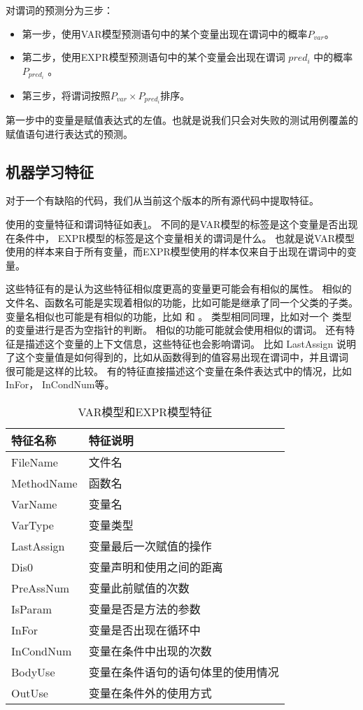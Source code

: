 对谓词的预测分为三步：
\begin{itemize}
\item 第一步，使用VAR模型预测语句中的某个变量出现在谓词中的概率$P_{var}$。
\item 第二步，使用EXPR模型预测语句中的某个变量会出现在谓词 $pred_i$ 中的概率 $P_{pred_i}$ 。
\item 第三步，将谓词按照$P_{var} \times P_{pred_i}$排序。
\end{itemize}

第一步中的变量是赋值表达式的左值。也就是说我们只会对失败的测试用例覆盖的赋值语句进行表达式的预测。

\subsection{机器学习特征}

对于一个有缺陷的代码，我们从当前这个版本的所有源代码中提取特征。

使用的变量特征和谓词特征如表\ref{var_feature}。
不同的是VAR模型的标签是这个变量是否出现在条件中，
EXPR模型的标签是这个变量相关的谓词是什么。
也就是说VAR模型使用的样本来自于所有变量，而EXPR模型使用的样本仅来自于出现在谓词中的变量。

这些特征有的是认为这些特征相似度更高的变量更可能会有相似的属性。
相似的文件名、函数名可能是实现着相似的功能，比如可能是继承了同一个父类的子类。
变量名相似也可能是有相似的功能，比如  和 。
类型相同同理，比如对一个  类型的变量进行是否为空指针的判断。
相似的功能可能就会使用相似的谓词。
还有特征是描述这个变量的上下文信息，这些特征也会影响谓词。
比如 LastAssign 说明了这个变量值是如何得到的，比如从函数得到的值容易出现在谓词中，并且谓词
很可能是这样的比较。
有的特征直接描述这个变量在条件表达式中的情况，比如 InFor， InCondNum等。


\begin{table}
\centering
\begin{tabular}{|l|l|}
\hline
特征名称 & 特征说明 \\
\hline
FileName & 文件名 \\
\hline
MethodName & 函数名 \\
\hline
VarName & 变量名 \\
\hline
VarType & 变量类型 \\
\hline
LastAssign & 变量最后一次赋值的操作 \\
\hline
Dis0 & 变量声明和使用之间的距离 \\
\hline
PreAssNum & 变量此前赋值的次数 \\
\hline
IsParam & 变量是否是方法的参数 \\
\hline
InFor & 变量是否出现在循环中 \\
\hline
InCondNum & 变量在条件中出现的次数 \\
\hline
BodyUse & 变量在条件语句的语句体里的使用情况 \\
\hline
OutUse & 变量在条件外的使用方式 \\
\hline
\end{tabular}
\caption{VAR模型和EXPR模型特征}
\label{var_feature}
\end{table}

